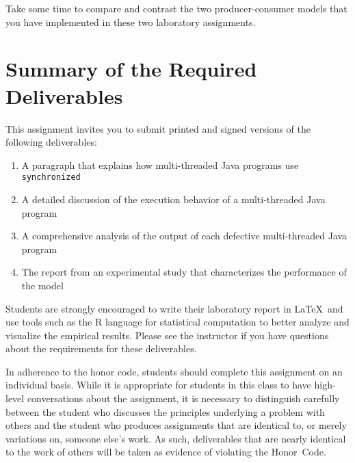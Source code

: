 Take some time to compare and contrast the two producer-consumer models that you have implemented in these two
laboratory assignments.

\section*{Summary of the Required Deliverables}

This assignment invites you to submit printed and signed versions of the following deliverables: 

\begin{enumerate} \item A paragraph that explains how multi-threaded Java programs use {\tt synchronized} \item A
    detailed discussion of the execution behavior of a multi-threaded Java program \item A comprehensive analysis of the
    output of each defective multi-threaded Java program \item The report from an experimental study that characterizes
    the performance of the model \end{enumerate}

Students are strongly encouraged to write their laboratory report in \LaTeX~and use tools such as the R language for
statistical computation to better analyze and visualize the empirical results. Please see the instructor if you have
questions about the requirements for these deliverables.

In adherence to the honor code, students should complete this assignment on an individual basis. While it is appropriate
for students in this class to have high-level conversations about the assignment, it is necessary to distinguish
carefully between the student who discusses the principles underlying a problem with others and the student who produces
assignments that are identical to, or merely variations on, someone else's work.  As such, deliverables that are nearly
identical to the work of others will be taken as evidence of violating the \mbox{Honor Code}.  



  

